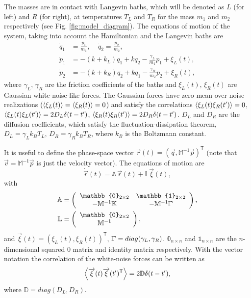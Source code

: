 The  masses are in contact with Langevin baths, which will be denoted as $L$ (for left) and $R$ (for right), at temperatures $T_{L}$ and $T_R$ for  the mass $m_1$ and $m_2$ respectively (see Fig. \ref{fig:model_diagram}). The equations of motion of the system, taking into account the Hamiltonian and the Langevin baths are
%
\begin{align}
  \dot{q}_1 &= \frac{p_1}{m_1},\;\;\;\;
  \dot{q}_2 = \frac{p_2}{m_2},\nonumber
  \\
  \dot{p}_1 &= -(k+k_L)q_1 + k q_2 -\frac{\gamma_L}{m_1} p_1 + \xi_L(t),\nonumber
  \\
  \dot{p}_2 &= -(k+k_R)q_2 + k q_1 -\frac{\gamma_R}{m_2} p_2 + \xi_R(t),
\end{align}
%
where $\gamma_L$, $\gamma_R$ are the friction coefficients of the baths and $\xi_L(t)$, $\xi_R(t)$ are Gaussian white-noise-like forces. The Gaussian forces have zero mean over noise realizations ($\expval{ \xi_L(t) } = \expval{ \xi_R(t) } = 0 $) and satisfy the correlations $\expval{ \xi_L(t)\xi_R(t') } = 0$, $\expval{ \xi_L(t)\xi_L(t') } = 2D_L\delta(t-t')$, $\expval{ \xi_R(t)\xi_R(t') } = 2D_R\delta(t-t')$. $D_L$ and $D_R$ are the diffusion coefficients, which satisfy the fluctuation-dissipation theorem, $D_L = \gamma_L k_B T_L$, $D_R =\gamma_R k_B T_R$, where  $k_B$ is the Boltzmann constant.

It is useful to define the phase-space vector $\overrightarrow{r}(t) = \left( \overrightarrow{q}, \mathbb{M}^{-1}\overrightarrow{p} \right)^\mathsf{T}$ (note that $\overrightarrow{v} = \mathbb{M}^{-1}\overrightarrow{p}$ is just the velocity vector).  The equations of motion are
%
\begin{equation}
  \dot{\overrightarrow{r}}(t) = \mathbb{A} \, \overrightarrow{r}(t) + \mathbb{L}\overrightarrow{\xi}(t),
  \label{eq:vectorEqOfMotion}
\end{equation}
%
with
%
\begin{align}
  \mathbb{A} &=
  \left(
  \begin{array}{cc}
    \mathbb{0}_{2 \times 2} & \mathbb{1}_{2 \times 2}
    \\
    -\mathbb{M}^{-1}\mathbb{K} & -\mathbb{M}^{-1}\bbGamma
  \end{array}
  \right),
  \nonumber
  \\
  \mathbb{L} &=
  \left(
  \begin{array}{c}
    \mathbb{0}_{2\times 2} \\ \mathbb{M}^{-1}
  \end{array}
  \right),
  \label{eq:Dynamical_Matrix}
\end{align}
%
and $\overrightarrow{\xi}(t) = \left( \xi_L(t),\xi_R(t) \right)^\mathsf{T}$, $\bbGamma = diag(\gamma_L,\gamma_R)$. $\mathbb{0}_{n\times n}$ and $\mathbb{1}_{n\times n}$ are the $n$-dimensional squared 0 matrix and identity matrix respectively. With the vector notation the correlation of the white-noise forces can be written as
%
\begin{equation}
  \expval{\overrightarrow{\xi}(t)\overrightarrow{\xi}(t')^\mathsf{T}} = 2 \mathbb{D}\delta(t-t'),
\end{equation}
%
where $\mathbb{D} = diag(D_L,D_R)$.
%
%
%
%
%
%

